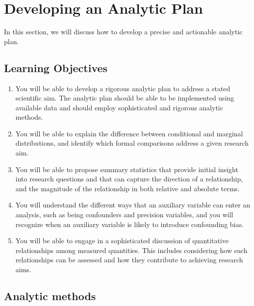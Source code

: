 \section{Developing an Analytic Plan}
\label{sec:3.2}

In this section, we will discuss how to develop a precise and actionable analytic plan.

\subsection{Learning Objectives}

\begin{enumerate}

\item You will be able to develop a rigorous analytic plan to address a stated scientific aim.  The analytic plan should be able to be implemented using available data and should employ sophisticated and rigorous analytic methods.

\item You will be able to explain the difference between conditional and marginal distributions, and identify which formal comparisons address a given research aim.
\item You will be able to propose summary statistics that provide initial insight into research questions and that can capture the direction of a relationship, and the magnitude of the relationship in both relative and absolute terms.

\item You will understand the different ways that an auxiliary variable can enter an analysis, such as being confounders and precision variables, and you will recognize when an auxiliary variable is likely to introduce confounding bias.

\item You will be able to engage in a sophisticated discussion of quantitative relationships among measured quantities. This includes considering how such relationships can be assessed and how they contribute to achieving research aims.

\end{enumerate}

\subsection{Analytic methods}

